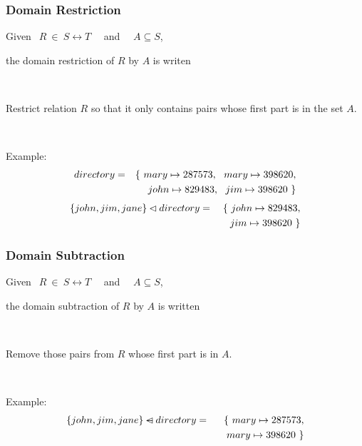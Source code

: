 \documentclass{beamer}
\begin{document}
\begin{frame}

\frametitle{Domain Restriction}

Given $~~R ~\in~ S\rel T $   ~~and~~ $A\subseteq S$,


the \alert{domain restriction} of $R$ by $A$  is writen~ 

~

Restrict relation $R$ so that it only contains pairs whose first part
is in the set $A$.

~

Example:
\begin{eqnarray*}
    directory & = &
    \{~ mary \mapsto 287573,~~
  mary \mapsto 398620, \\
&& ~~~ john \mapsto 829483,~~
  jim \mapsto 398620 ~\}
\end{eqnarray*}
%
\begin{eqnarray*}
    \{john,jim,jane\} \mathbin\lhd directory & = &
    \{~ john \mapsto 829483, \\
&&~~~  jim \mapsto 398620 ~\}
\end{eqnarray*}




\end{frame}



\begin{frame}

\frametitle{Domain Subtraction}

Given $~~R ~\in~ S\rel T $   ~~and~~ $A\subseteq S$,

the \alert{domain subtraction} of $R$ by $A$  is written~ 

~

Remove those pairs from $R$ whose first part is in  $A$.

~

Example:
\begin{eqnarray*}
    \{john,jim,jane\} \mathbin{\lhd\mkern-14mu-} directory & = &
    \{~ mary \mapsto 287573, \\
&&~~~  mary \mapsto 398620 ~\}
\end{eqnarray*}




\end{frame}
\end{document}

